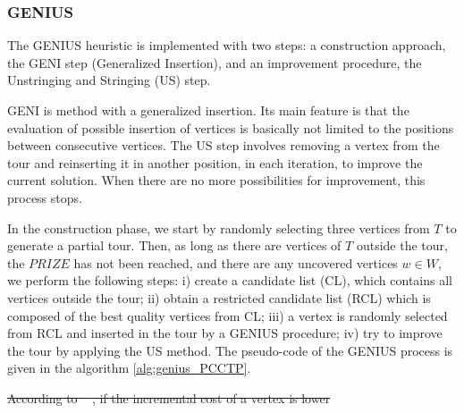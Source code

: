 \documentclass{singlecol-new}
\providecommand{\DIFadd}[1]{{\protect\color{blue}\uwave{#1}}} %
\providecommand{\DIFdel}[1]{{\protect\color{red}\sout{#1}}}                      %
\providecommand{\DIFaddbegin}{} %
\providecommand{\DIFaddend}{} %
\providecommand{\DIFdelbegin}{} %
\providecommand{\DIFdelend}{} %
\begin{document}
\DIFdelend \subsubsection{GENIUS}

The GENIUS heuristic \citep{genius} is implemented with  two steps: a construction approach, the GENI step (Generalized Insertion), and an improvement procedure, the Unstringing and Stringing (US) step. 

GENI is \DIFaddbegin \DIFadd{a }\DIFaddend method with a generalized insertion. Its main feature is that the evaluation of possible insertion of vertices is basically not limited to the positions between consecutive vertices.
The US step involves removing a vertex from the tour and reinserting it in another position, in each iteration, to improve the current solution. When there are no more possibilities for improvement, this process stops.


In the construction phase, we start by randomly selecting three vertices from $T$ to generate a partial tour. Then, as long as there are vertices of $T$ outside the tour, the $PRIZE$ has not been reached, and there are any uncovered vertices $w \in W $, we  perform the following steps: i) create a candidate list (CL), which contains all vertices outside the tour; ii) obtain a restricted candidate list (RCL) which is composed of the best quality vertices from CL; iii) a vertex is randomly selected from RCL and inserted in the tour by a GENIUS procedure; iv) try to improve the tour by applying the US method. The pseudo-code of the GENIUS process is given in the algorithm \ref{alg:genius_PCCTP}.

\DIFdelbegin \DIFdel{According to \mbox{%
\citet{daSilva}}\hskip0pt%
, if the incremental cost of a vertex is lower }\DIFdelend %
\DIFaddbegin 
\end{document}

